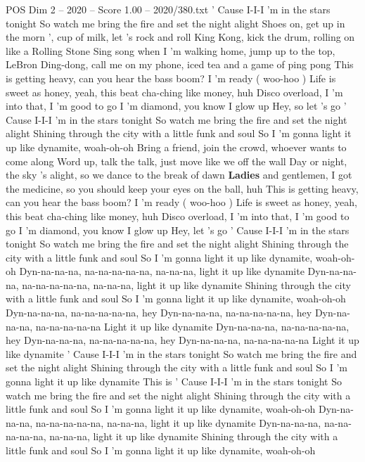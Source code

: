 \begin{textsample}{POS Dim 2 – 2020 – Score 1.00 – 2020/380.txt}  \label{ex:f2_pos_026}
' Cause I-I-I 'm in the stars tonight So watch me bring the fire and set the night alight Shoes on, get up in the morn ', cup of milk, let 's rock and roll King Kong, kick the drum, rolling on like a Rolling Stone Sing song when I 'm walking home, jump up to the top, LeBron Ding-dong, call me on my phone, iced tea and a game of ping pong This is getting heavy, can you hear the bass boom?
I 'm ready ( woo-hoo ) Life is sweet as honey, yeah, this beat cha-ching like money, huh Disco overload, I 'm into that, I 'm good to go I 'm diamond, you know I glow up Hey, so let 's go ' Cause I-I-I 'm in the stars tonight So watch me bring the fire and set the night alight Shining through the city with a little funk and soul So I 'm gonna light it up like dynamite, woah-oh-oh Bring a friend, join the crowd, whoever wants to come along Word up, talk the talk, just move like we off the wall Day or night, the sky 's alight, so we dance to the break of dawn \textbf{Ladies} and gentlemen, I got the medicine, so you should keep your eyes on the ball, huh This is getting heavy, can you hear the bass boom?
I 'm ready ( woo-hoo ) Life is sweet as honey, yeah, this beat cha-ching like money, huh Disco overload, I 'm into that, I 'm good to go I 'm diamond, you know I glow up Hey, let 's go ' Cause I-I-I 'm in the stars tonight So watch me bring the fire and set the night alight Shining through the city with a little funk and soul So I 'm gonna light it up like dynamite, woah-oh-oh Dyn-na-na-na, na-na-na-na-na, na-na-na, light it up like dynamite Dyn-na-na-na, na-na-na-na-na, na-na-na, light it up like dynamite Shining through the city with a little funk and soul So I 'm gonna light it up like dynamite, woah-oh-oh Dyn-na-na-na, na-na-na-na-na, hey Dyn-na-na-na, na-na-na-na-na, hey Dyn-na-na-na, na-na-na-na-na Light it up like dynamite Dyn-na-na-na, na-na-na-na-na, hey Dyn-na-na-na, na-na-na-na-na, hey Dyn-na-na-na, na-na-na-na-na Light it up like dynamite ' Cause I-I-I 'm in the stars tonight So watch me bring the fire and set the night alight Shining through the city with a little funk and soul So I 'm gonna light it up like dynamite This is ' Cause I-I-I 'm in the stars tonight So watch me bring the fire and set the night alight Shining through the city with a little funk and soul So I 'm gonna light it up like dynamite, woah-oh-oh Dyn-na-na-na, na-na-na-na-na, na-na-na, light it up like dynamite Dyn-na-na-na, na-na-na-na-na, na-na-na, light it up like dynamite Shining through the city with a little funk and soul So I 'm gonna light it up like dynamite, woah-oh-oh

\end{textsample}

